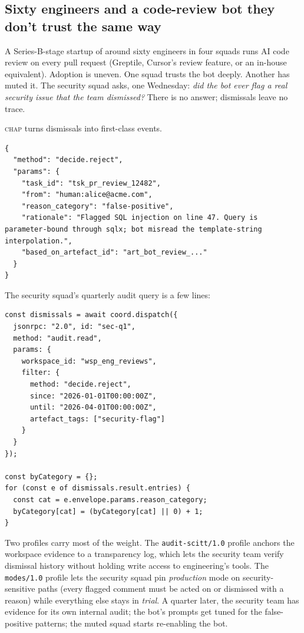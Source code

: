 \documentclass[11pt]{article}
\newcommand{\chap}{\textsc{chap}}
\begin{document}
\subsection{Sixty engineers and a code-review bot they don't trust the same way}

A Series-B-stage startup of around sixty engineers in four squads runs AI code review on every pull request (Greptile, Cursor's review feature, or an in-house equivalent). Adoption is uneven. One squad trusts the bot deeply. Another has muted it. The security squad asks, one Wednesday: \emph{did the bot ever flag a real security issue that the team dismissed?} There is no answer; dismissals leave no trace.

\chap{} turns dismissals into first-class events.

\begin{lstlisting}[caption={Dismissal with category and rationale.},label={lst:case5-reject}]
{
  "method": "decide.reject",
  "params": {
    "task_id": "tsk_pr_review_12482",
    "from": "human:alice@acme.com",
    "reason_category": "false-positive",
    "rationale": "Flagged SQL injection on line 47. Query is parameter-bound through sqlx; bot misread the template-string interpolation.",
    "based_on_artefact_id": "art_bot_review_..."
  }
}
\end{lstlisting}

The security squad's quarterly audit query is a few lines:

\begin{lstlisting}[caption={Quarterly dismissal-rate query.},label={lst:case5-query}]
const dismissals = await coord.dispatch({
  jsonrpc: "2.0", id: "sec-q1",
  method: "audit.read",
  params: {
    workspace_id: "wsp_eng_reviews",
    filter: {
      method: "decide.reject",
      since: "2026-01-01T00:00:00Z",
      until: "2026-04-01T00:00:00Z",
      artefact_tags: ["security-flag"]
    }
  }
});

const byCategory = {};
for (const e of dismissals.result.entries) {
  const cat = e.envelope.params.reason_category;
  byCategory[cat] = (byCategory[cat] || 0) + 1;
}
\end{lstlisting}

Two profiles carry most of the weight. The \texttt{audit-scitt/1.0} profile anchors the workspace evidence to a transparency log, which lets the security team verify dismissal history without holding write access to engineering's tools. The \texttt{modes/1.0} profile lets the security squad pin \emph{production} mode on security-sensitive paths (every flagged comment must be acted on or dismissed with a reason) while everything else stays in \emph{trial}. A quarter later, the security team has evidence for its own internal audit; the bot's prompts get tuned for the false-positive patterns; the muted squad starts re-enabling the bot.
\end{document}
